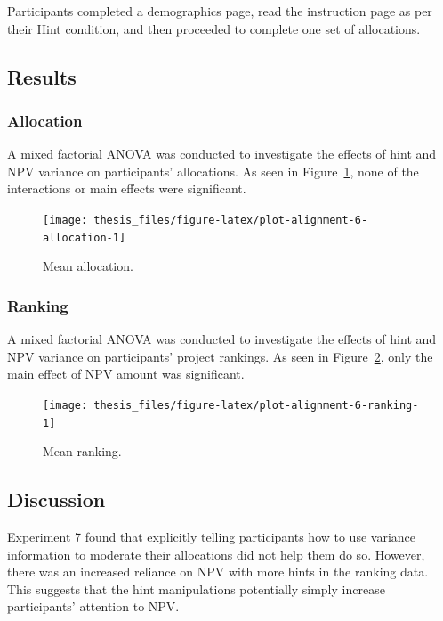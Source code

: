 \documentclass[a4paper, nobind, dvipsnames]{templates/ociamthesis}
\theoremstyle{definition}
\theoremstyle{definition}
\theoremstyle{definition}
\theoremstyle{definition}
\theoremstyle{remark}
\begin{document}
Participants completed a demographics page, read the instruction page as per
their Hint condition, and then proceeded to complete one set of allocations.

\subsection{Results}

\subsubsection{Allocation}

A mixed factorial ANOVA was conducted to investigate the effects of hint
and NPV variance on participants' allocations. As seen in
Figure~\ref{fig:plot-alignment-6-allocation}, none of the interactions or main
effects were significant.



\begin{figure}
\texttt{[image: thesis\_files/figure-latex/plot-alignment-6-allocation-1]} \caption{Mean allocation.}\label{fig:plot-alignment-6-allocation}
\end{figure}

\subsubsection{Ranking}

A mixed factorial ANOVA was conducted to investigate the effects of hint
and NPV variance on participants' project rankings. As seen in
Figure~\ref{fig:plot-alignment-6-ranking}, only the main effect of NPV amount
was significant.



\begin{figure}
\texttt{[image: thesis\_files/figure-latex/plot-alignment-6-ranking-1]} \caption{Mean ranking.}\label{fig:plot-alignment-6-ranking}
\end{figure}

\subsection{Discussion}

Experiment 7 found that explicitly telling participants how to use variance
information to moderate their allocations did not help them do so. However,
there was an increased reliance on NPV with more hints in the ranking data. This
suggests that the hint manipulations potentially simply increase participants'
attention to NPV.
\end{document}
